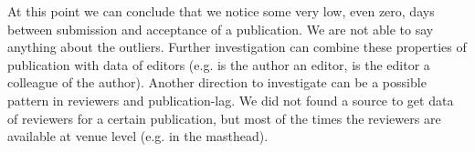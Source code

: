 \documentclass{ou-report}
\begin{document}
At this point we can conclude that we notice some very low, even zero, days 
between submission and acceptance of a publication. We are not able to say 
anything about the outliers. Further 
investigation can combine these properties of publication with data of editors (e.g.
is the author an editor, is the editor a colleague of the author). Another
direction to investigate can be a possible pattern in reviewers and publication-lag.
We did not found a source to get data of reviewers for a certain publication, 
but most of the times the reviewers are available at venue level (e.g. in the masthead).









\end{document}
